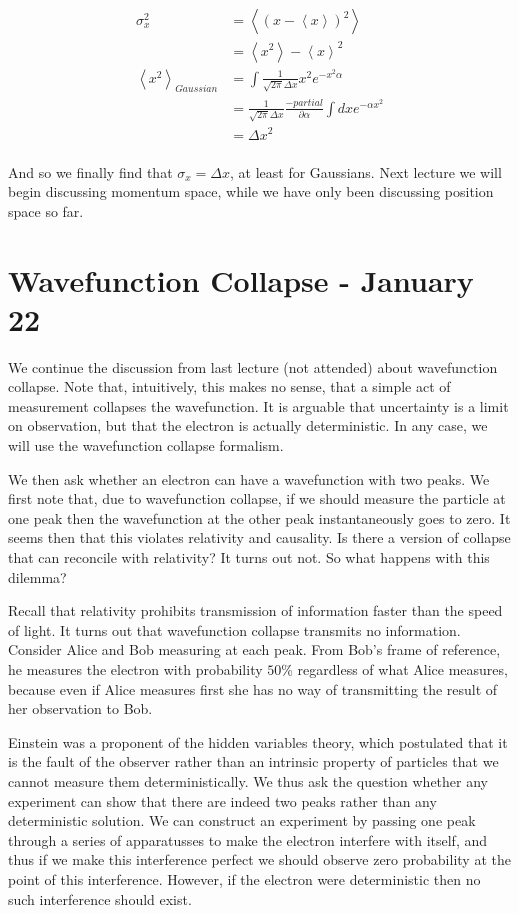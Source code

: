 \documentclass{report}
\begin{document}
\begin{align*}
    \sigma_x^2 &= \left<(x - \left<x\right>)^2\right>\\
               &= \left<x^2\right> - \left<x\right>^2\\
    \left<x^2\right>_{Gaussian} &= \int{\frac{1}{\sqrt{2\pi}\Delta x} x^2 e^{-x^2\alpha}}\\
                                &= \frac{1}{\sqrt{2\pi}\Delta x}\frac{-partial}{\partial \alpha}\int{dx e^{-\alpha x^2}}\\
                                &= \Delta x^2\\
\end{align*}

And so we finally find that $\sigma_x = \Delta x$, at least for Gaussians. Next lecture we will begin discussing momentum space, while we have only been discussing position space so far.

\chapter{Wavefunction Collapse - January 22}

We continue the discussion from last lecture (not attended) about wavefunction collapse. Note that, intuitively, this makes no sense, that a simple act of measurement collapses the wavefunction. It is arguable that uncertainty is a limit on observation, but that the electron is actually deterministic. In any case, we will use the wavefunction collapse formalism.

We then ask whether an electron can have a wavefunction with two peaks. We first note that, due to wavefunction collapse, if we should measure the particle at one peak then the wavefunction at the other peak instantaneously goes to zero. It seems then that this violates relativity and causality. Is there a version of collapse that can reconcile with relativity? It turns out not. So what happens with this dilemma?

Recall that relativity prohibits transmission of information faster than the speed of light. It turns out that wavefunction collapse transmits no information. Consider Alice and Bob measuring at each peak. From Bob's frame of reference, he measures the electron with probability $50$\% regardless of what Alice measures, because even if Alice measures first she has no way of transmitting the result of her observation to Bob. 

Einstein was a proponent of the hidden variables theory, which postulated that it is the fault of the observer rather than an intrinsic property of particles that we cannot measure them deterministically. We thus ask the question whether any experiment can show that there are indeed two peaks rather than any deterministic solution. We can construct an experiment by passing one peak through a series of apparatusses to make the electron interfere with itself, and thus if we make this interference perfect we should observe zero probability at the point of this interference. However, if the electron were deterministic then no such interference should exist. 
\end{document}
